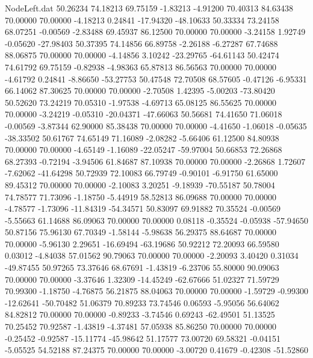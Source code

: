 \begin{filecontents}{NodeLeft.dat}
  50.26234   74.18213   69.75159    -1.83213   -4.91200   70.40313   84.63438   70.00000   70.00000   -4.18213    0.24841  -17.94320  -48.10633
  50.33334   73.24158   68.07251    -0.00569   -2.83488   69.45937   86.12500   70.00000   70.00000   -3.24158    1.92749   -0.05620  -27.98403
  50.37395   74.14856   66.89758    -2.26188   -6.27287   67.74688   88.06875   70.00000   70.00000   -4.14856    3.10242  -23.29765  -64.61143
  50.42474   74.61792   69.75159    -0.82938   -4.98363   65.87813   86.56563   70.00000   70.00000   -4.61792    0.24841   -8.86650  -53.27753
  50.47548   72.70508   68.57605    -0.47126   -6.95331   66.14062   87.30625   70.00000   70.00000   -2.70508    1.42395   -5.00203  -73.80420
  50.52620   73.24219   70.05310    -1.97538   -4.69713   65.08125   86.55625   70.00000   70.00000   -3.24219   -0.05310  -20.04371  -47.66063
  50.56681   74.41650   71.06018    -0.00569   -3.87344   62.90000   85.38438   70.00000   70.00000   -4.41650   -1.06018   -0.05635  -38.33502
  50.61767   74.65149   71.16089    -2.08282   -5.66406   61.12500   84.80938   70.00000   70.00000   -4.65149   -1.16089  -22.05247  -59.97004
  50.66853   72.26868   68.27393    -0.72194   -3.94506   61.84687   87.10938   70.00000   70.00000   -2.26868    1.72607   -7.62062  -41.64298
  50.72939   72.10083   66.79749    -0.90101   -6.91750   61.65000   89.45312   70.00000   70.00000   -2.10083    3.20251   -9.18939  -70.55187
  50.78004   74.78577   71.73096    -1.18750   -5.44919   58.52813   86.09688   70.00000   70.00000   -4.78577   -1.73096  -11.84319  -54.34571
  50.83097   69.91882   70.35524    -0.00569   -5.55663   61.14688   86.09063   70.00000   70.00000    0.08118   -0.35524   -0.05938  -57.94650
  50.87156   75.96130   67.70349    -1.58144   -5.98638   56.29375   88.64687   70.00000   70.00000   -5.96130    2.29651  -16.69494  -63.19686
  50.92212   72.20093   66.59580     0.03012   -4.84038   57.01562   90.79063   70.00000   70.00000   -2.20093    3.40420    0.31034  -49.87455
  50.97265   73.37646   68.67691    -1.43819   -6.23706   55.80000   90.09063   70.00000   70.00000   -3.37646    1.32309  -14.45249  -62.67666
  51.02327   71.59729   70.99300    -1.18750   -4.76875   56.21875   88.04063   70.00000   70.00000   -1.59729   -0.99300  -12.62641  -50.70482
  51.06379   70.89233   73.74546     0.06593   -5.95056   56.64062   84.82812   70.00000   70.00000   -0.89233   -3.74546    0.69243  -62.49501
  51.13525   70.25452   70.92587    -1.43819   -4.37481   57.05938   85.86250   70.00000   70.00000   -0.25452   -0.92587  -15.11774  -45.98642
  51.17577   73.00720   69.58321    -0.04151   -5.05525   54.52188   87.24375   70.00000   70.00000   -3.00720    0.41679   -0.42308  -51.52860

\end{filecontents}
